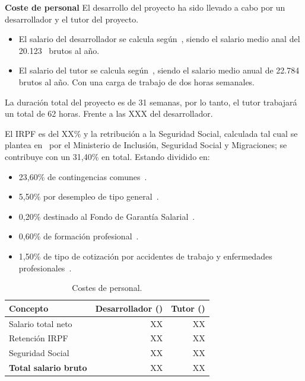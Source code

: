 \textbf{Coste de personal}
El desarrollo del proyecto ha sido llevado a cabo por un desarrollador y el tutor del proyecto.
\begin{itemize}
\item El salario del desarrollador se calcula según~\cite{SalarioJunior}, siendo el salario medio anal del 20.123~\officialeuro{} brutos al año.
\item El salario del tutor se calcula según~\cite{SalarioInvestigador}, siendo el salario medio anual de 22.784~\officialeuro{} brutos al año. Con una carga de trabajo de dos horas semanales.
\end{itemize}

La duración total del proyecto es de 31 semanas, por lo tanto, el tutor trabajará un total de 62 horas. Frente a las XXX del desarrollador.

El IRPF es del XX\% y la retribución a la Seguridad Social, calculada tal cual se plantea en~\cite{ss_cotizacion} por el Ministerio de Inclusión, Seguridad Social y Migraciones; se contribuye con un 31,40\% en total. Estando dividido en:
\begin{itemize}
\tightlist
\item 23,60\% de contingencias comunes~\cite{BOEPCM2442022}.
\item 5,50\% por desempleo de tipo general~\cite{BOEPCM2442022}.
\item 0,20\% destinado al Fondo de Garantía Salarial~\cite{BOEPCM2442022}.
\item 0,60\% de formación profesional~\cite{BOEPCM2442022}.
\item 1,50\% de tipo de cotización por accidentes de trabajo y enfermedades profesionales~\cite{BOEENFERMEDADES}.
\end{itemize}

\begin{table}[H]
\centering
\begin{tabular}{lrr}
	\toprule
	\textbf{Concepto} & \textbf{Desarrollador (\officialeuro)} & \textbf{Tutor (\officialeuro)}\\
	\midrule
	Salario total neto & XX & XX \\
	Retención IRPF & XX & XX \\
	Seguridad Social & XX & XX \\
	\midrule
	\textbf{Total salario bruto} & XX & XX \\
	\bottomrule
\end{tabular}
\caption{Costes de personal.}\label{tab:costes-personal}
\end{table}

